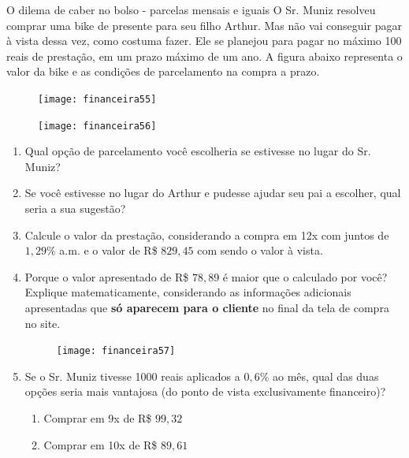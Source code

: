 \begin{task}{O dilema de caber no bolso - parcelas mensais e iguais}
O Sr. Muniz resolveu comprar uma bike de presente para seu filho Arthur. Mas não vai conseguir pagar à vista dessa vez, como costuma fazer. Ele se planejou para pagar no máximo 100 reais de prestação, em um prazo máximo de um ano. A figura abaixo representa o valor da bike e as condições de parcelamento na compra a prazo.

\begin{figure}[H]
\centering

\texttt{[image: financeira55]}

\texttt{[image: financeira56]}
\end{figure}

\begin{enumerate}
\item Qual opção de parcelamento você escolheria se estivesse no lugar do Sr. Muniz?
\item Se você estivesse no lugar do Arthur e pudesse ajudar seu pai a escolher, qual seria a sua sugestão?
\item Calcule o valor da prestação, considerando a compra em 12x com juntos de $1{,}29\%$ a.m. e o valor de R\$ $829{,}45$ com sendo o valor à vista. 
\item Porque o valor apresentado de R\$ $78{,}89$ é maior que o calculado por você? Explique matematicamente, considerando as informações adicionais apresentadas que \textbf{só aparecem para o cliente} no final da tela de compra no site.

\begin{figure}[H]
\centering

\texttt{[image: financeira57]}
\end{figure}

\item Se o Sr. Muniz tivesse 1000 reais aplicados a $0{,}6\%$ ao mês, qual das duas opções seria mais vantajosa (do ponto de vista exclusivamente financeiro)?

\begin{enumerate}[label=\Roman* -]
\item Comprar em 9x de R\$ $99{,}32$
\item Comprar em 10x de R\$ $89{,}61$
\end{enumerate}
\end{enumerate}
\end{task}

